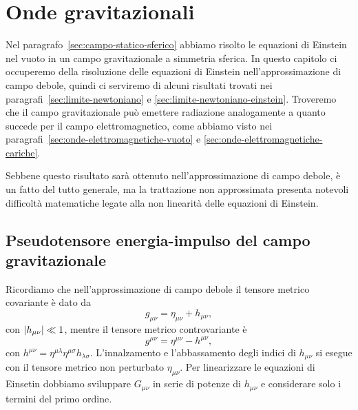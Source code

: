 \chapter{Onde gravitazionali}
\label{cha:onde-grav}

Nel paragrafo~\ref{sec:campo-statico-sferico} abbiamo risolto le equazioni di
Einstein nel vuoto in un campo gravitazionale a simmetria sferica.  In questo
capitolo ci occuperemo della risoluzione delle equazioni di Einstein
nell'approssimazione di campo debole, quindi ci serviremo di alcuni risultati
trovati nei paragrafi~\ref{sec:limite-newtoniano} e
\ref{sec:limite-newtoniano-einstein}.  Troveremo che il campo gravitazionale può
emettere radiazione analogamente a quanto succede per il campo elettromagnetico,
come abbiamo visto nei paragrafi~\ref{sec:onde-elettromagnetiche-vuoto} e
\ref{sec:onde-elettromagnetiche-cariche}.

Sebbene questo risultato sarà ottenuto nell'approssimazione di campo debole, è
un fatto del tutto generale, ma la trattazione non approssimata presenta
notevoli difficoltà matematiche legate alla non linearità delle equazioni di
Einstein.

\section{Pseudotensore energia-impulso del campo gravitazionale}
\label{sec:energ-impulso-grav}

Ricordiamo che nell'approssimazione di campo
debole il tensore metrico covariante è dato da
\begin{equation}
  g_{\mu\nu} = \eta_{\mu\nu} + h_{\mu\nu},
\end{equation}
con $\lvert h_{\mu\nu}\rvert \ll 1$, mentre il tensore metrico controvariante è
\begin{equation}
  g^{\mu\nu} = \eta^{\mu\nu} - h^{\mu\nu},
\end{equation}
con $h^{\mu\nu} = \eta^{\mu\lambda}\eta^{\mu\sigma} h_{\lambda\sigma}$.
L'innalzamento e l'abbassamento degli indici di $h_{\mu\nu}$ si esegue con il
tensore metrico non perturbato $\eta_{\mu\nu}$.  Per linearizzare le equazioni
di Einsetin dobbiamo sviluppare $G_{\mu\nu}$ in serie di potenze di $h_{\mu\nu}$
e considerare solo i termini del primo ordine.

